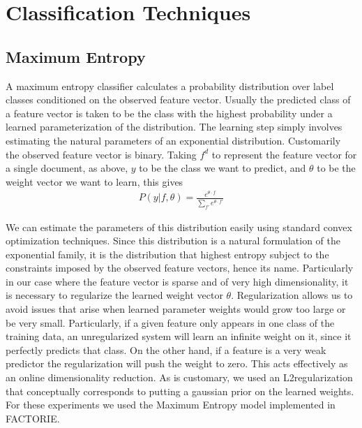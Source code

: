 \section{Classification Techniques}

\subsection{Maximum Entropy} %
\label{sub:maximum_entropy}
\indent
A maximum entropy classifier calculates a probability distribution over label classes conditioned on the observed feature vector. Usually the predicted class of a feature vector is taken to be the class with the highest probability under a learned parameterization of the distribution. The learning step simply involves estimating the natural parameters of an exponential distribution. Customarily the observed feature vector is binary. Taking $f^d$ to represent the feature vector for a single document, as above, $y$ to be the class we want to predict, and $\theta$ to be the weight vector we want to learn, this gives
\begin{align*}
	P(y|f, \theta) = \frac{e^{\theta \cdot f}}{\sum_{f'} e^{\theta \cdot f'}}
\end{align*}

We can estimate the parameters of this distribution easily using standard convex optimization techniques. Since this distribution is a natural formulation of the exponential family, it is the distribution that highest entropy subject to the constraints imposed by the observed feature vectors, hence its name. Particularly in our case where the feature vector is sparse and of very high dimensionality, it is necessary to regularize the learned weight vector $\theta$. Regularization allows us to avoid issues that arise when learned parameter weights would grow too large or be very small. Particularly, if a given feature only appears in one class of the training data, an unregularized system will learn an infinite weight on it, since it perfectly predicts that class. On the other hand, if a feature is a very weak predictor the regularization will push the weight to zero. This acts effectively as an online dimensionality reduction. As is customary, we used an L2regularization that conceptually corresponds to putting a gaussian prior on the learned weights. For these experiments we used the Maximum Entropy model implemented in FACTORIE.

